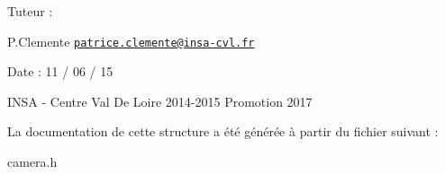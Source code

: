 Tuteur \-:
\begin{DoxyItemize}
\item P.\-Clemente \href{mailto:patrice.clemente@insa-cvl.fr}{\tt patrice.\-clemente@insa-\/cvl.\-fr}
\end{DoxyItemize}

Date \-: 11 / 06 / 15

I\-N\-S\-A -\/ Centre Val De Loire 2014-\/2015 Promotion 2017 

La documentation de cette structure a été générée à partir du fichier suivant \-:\begin{DoxyCompactItemize}
\item 
camera.\-h\end{DoxyCompactItemize}
